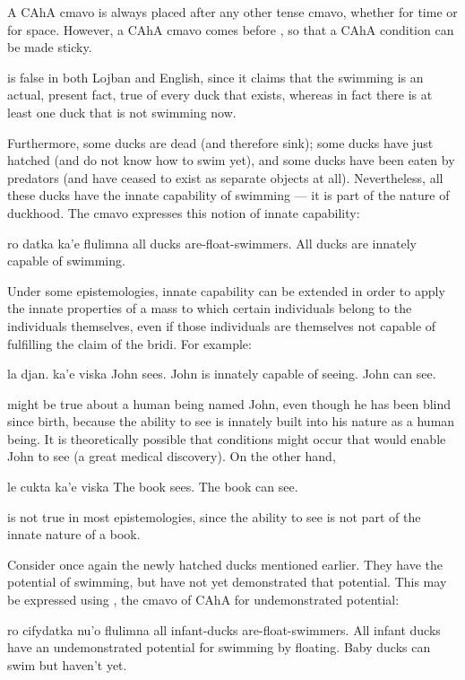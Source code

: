 A CAhA cmavo is always placed after any other tense cmavo,
    whether for time or for space. However, a CAhA cmavo comes
    before , so that a CAhA condition can be made sticky. 

 is false in both Lojban
    and English, since it claims that the swimming is an actual,
    present fact, true of every duck that exists, whereas in fact
    there is at least one duck that is not swimming now.

Furthermore, some ducks are dead (and therefore sink); some
    ducks have just hatched (and do not know how to swim yet), and
    some ducks have been eaten by predators (and have ceased to
    exist as separate objects at all). Nevertheless, all these
    ducks have the innate capability of swimming --- it is part of
    the nature of duckhood. The cmavo  expresses this
    notion of innate capability:
\begin{example}
ro datka ka'e flulimna\n
all ducks  are-float-swimmers.\n
All ducks are innately capable of swimming.
\end{example}

Under some epistemologies, innate capability can be extended in
    order to apply the innate properties of a mass to which certain
    individuals belong to the individuals themselves, even if those
    individuals are themselves not capable of fulfilling the claim
    of the bridi. For example:
\begin{example}
la djan. ka'e viska\n
John  sees.\n
John is innately capable of seeing.\n
John can see.
\end{example}

{\noindent}might be true about a human being named John, even though he
    has been blind since birth, because the ability to see is
    innately built into his nature as a human being. It is
    theoretically possible that conditions might occur that would
    enable John to see (a great medical discovery). On the other
    hand,
\begin{example}
le cukta ka'e viska\n
The book  sees.\n
The book can see.
\end{example}

{\noindent}is not true in most epistemologies, since the ability to see is
    not part of the innate nature of a book. 

Consider once again the newly hatched ducks mentioned
    earlier. They have the potential of swimming, but have not yet
    demonstrated that potential. This may be expressed using
    , the cmavo of CAhA for undemonstrated potential:
\begin{example}
ro cifydatka nu'o flulimna\n
all infant-ducks  are-float-swimmers.\n
All infant ducks have an undemonstrated potential\n
\T	for swimming by floating.\n
Baby ducks can swim but haven't yet.
\end{example}

